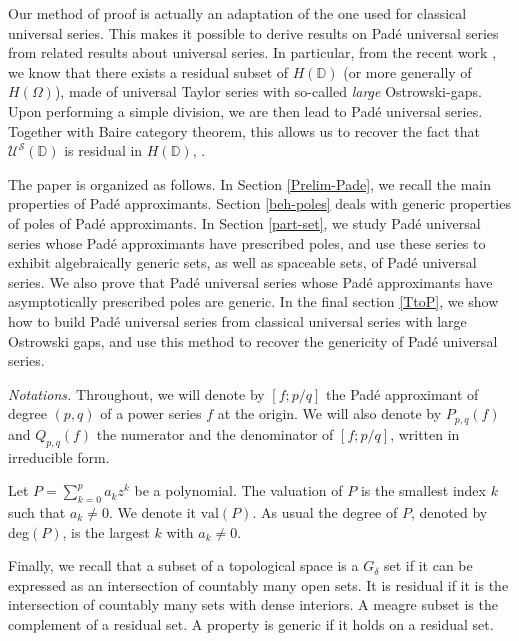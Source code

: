 \documentclass[12pt]{amsart}
\numberwithin{equation}{section}
\begin{document}
Our method of proof is actually an adaptation of the one used for classical universal series. This makes it possible to derive results on Pad\'e universal series from related results about universal series.
In particular, from the recent work \cite{CM}, we know that there exists a 
residual subset of $H({\mathbb D})$ (or more generally of $H(\Omega)$), made of universal Taylor series with so-called {\it large} Ostrowski-gaps. Upon performing a simple division, we are then lead to
Pad\'e universal series. Together with Baire category theorem, this allows us to recover the fact that ${\mathcal U}^{\mathcal S}({\mathbb D})$ is residual in $H({\mathbb D})$, \cite[Theorem 3.1]{DFN}.

\medskip{}

The paper is organized as follows. In Section \ref{Prelim-Pade}, we recall the main properties of Pad\'e approximants. Section \ref{beh-poles} deals with generic properties of poles of Pad\'e approximants. In Section \ref{part-set}, we study Pad\'e universal series whose Pad\'e approximants have prescribed poles, and use these series to exhibit algebraically generic sets, as well as spaceable sets, of Pad\'e universal series. We also prove that Pad\'e universal series whose Pad\'e approximants have asymptotically prescribed poles are generic.
In the final section \ref{TtoP}, we show how to build Pad\'e universal series from classical universal series with large Ostrowski gaps, and use this method to recover the genericity of Pad\'e universal series.

\medskip{}

\noindent{}\emph{Notations.} 
Throughout, we will denote by $[f;p/q]$ the Pad\'e approximant of degree $(p,q)$ of a power series $f$ at the origin. We will also denote by $P_{p,q}(f)$ and $Q_{p,q}(f)$ the numerator and the denominator of $[f;p/q]$, written in irreducible form.

Let $P=\sum _{k=0}^pa_kz^k$ be a polynomial. The valuation of $P$ is the smallest index $k$ such that $a_k\neq 0$. We denote it $\text{val}(P)$. 
As usual the degree of $P$, denoted by deg$(P)$, is the largest $k$ with $a_k\neq 0$.

Finally, we recall that a subset of a topological space is a $G_{\delta}$ set if it can be expressed as an intersection of countably many open sets. It is residual if it is the intersection of countably many sets with dense interiors. A meagre subset is the complement of a residual set. A property is generic if it holds on a residual set.
\end{document}
